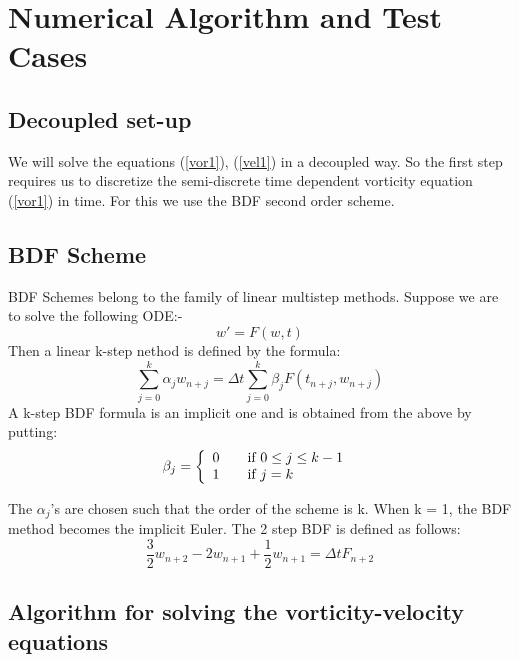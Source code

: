 \documentclass[11pt]{article}
\begin{document}
\section{Numerical Algorithm and Test Cases}
\subsection{Decoupled set-up}

We will solve the equations (\ref{vor1}), (\ref{vel1}) in a decoupled way. So the first step
requires us to discretize the semi-discrete time dependent 
vorticity equation (\ref{vor1}) in time. For this we use the BDF second order scheme. 
\subsection{BDF Scheme}
BDF Schemes belong to the family of linear multistep methods. Suppose we are to solve the following ODE:-
$$
w' = F(w,t)
$$
Then a linear k-step nethod is defined by the formula:
$$
\sum^k_{j=0}\alpha_jw_{n+j}  = \Delta{t}\sum^k_{j=0}\beta_jF(t_{n+j},w_{n+j})
$$
A k-step BDF formula is an implicit one and is obtained from the above by putting:
$$
\beta_j = \left\{ 
  \begin{array}{l l}
    0 & \quad \text{if $0\leq j\leq k-1$ }\\
    1 & \quad \text{if $j=k$}
  \end{array} \right.
$$

The $\alpha_j$'s are chosen such that the order of the scheme is k.
When k = 1, the BDF method becomes the implicit Euler. The 2 step BDF is defined as follows:
$$
\frac{3}{2}w_{n+2} - 2w_{n+1} + \frac{1}{2}w_{n+1} = \Delta{t}F_{n+2}
$$
\subsection{Algorithm for solving the vorticity-velocity equations}
\end{document}
